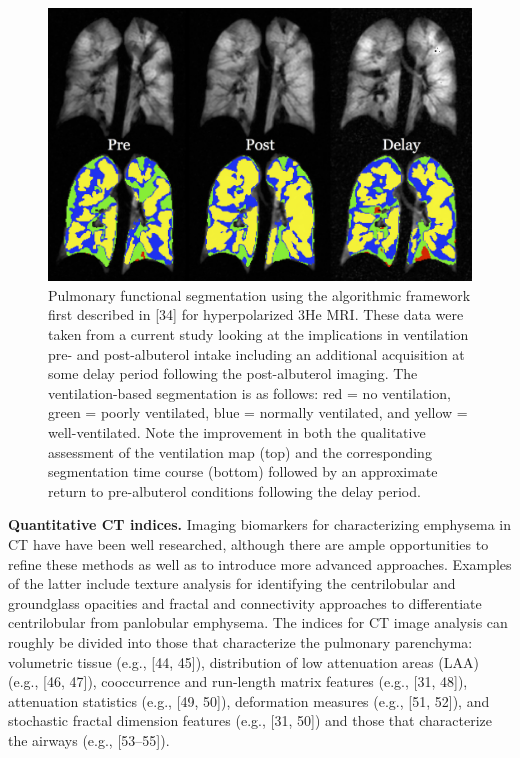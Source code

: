 \documentclass[11pt,]{article}
\begin{document}
\begin{figure}[htbp]
\centering
\includegraphics{Figs/prePostAlbuterol.png}
\caption{Pulmonary functional segmentation using the algorithmic
framework first described in {[}34{]} for hyperpolarized 3He MRI. These
data were taken from a current study looking at the implications in
ventilation pre- and post-albuterol intake including an additional
acquisition at some delay period following the post-albuterol imaging.
The ventilation-based segmentation is as follows: red = no ventilation,
green = poorly ventilated, blue = normally ventilated, and yellow =
well-ventilated. Note the improvement in both the qualitative assessment
of the ventilation map (top) and the corresponding segmentation time
course (bottom) followed by an approximate return to pre-albuterol
conditions following the delay period.}
\end{figure}

\textbf{Quantitative CT indices.} Imaging biomarkers for characterizing
emphysema in CT have have been well researched, although there are ample
opportunities to refine these methods as well as to introduce more
advanced approaches. Examples of the latter include texture analysis for
identifying the centrilobular and groundglass opacities and fractal and
connectivity approaches to differentiate centrilobular from panlobular
emphysema. The indices for CT image analysis can roughly be divided into
those that characterize the pulmonary parenchyma: volumetric tissue
(e.g., {[}44, 45{]}), distribution of low attenuation areas (LAA) (e.g.,
{[}46, 47{]}), cooccurrence and run-length matrix features (e.g., {[}31,
48{]}), attenuation statistics (e.g., {[}49, 50{]}), deformation
measures (e.g., {[}51, 52{]}), and stochastic fractal dimension features
(e.g., {[}31, 50{]}) and those that characterize the airways (e.g.,
{[}53--55{]}).
\end{document}
